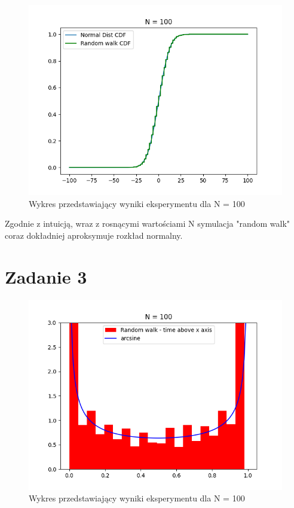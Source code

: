 \documentclass{report}
\begin{document}
\begin{figure}[htp]
    \centering
    \includegraphics[scale=0.5]{plotN100.png}
    \caption[Example .]{Wykres przedstawiający wyniki eksperymentu dla N = 100}
    \label{plotB}
\end{figure}

Zgodnie z intuicją, wraz z rosnącymi wartościami N symulacja "random walk"
coraz dokładniej aproksymuje rozkład normalny.

\section*{Zadanie 3}

\begin{figure}[htp]
    \centering
    \includegraphics[scale=0.5]{plotZad3N100.png}
    \caption[Example .]{Wykres przedstawiający wyniki eksperymentu dla N = 100}
    \label{plotB}
\end{figure}
\end{document}
